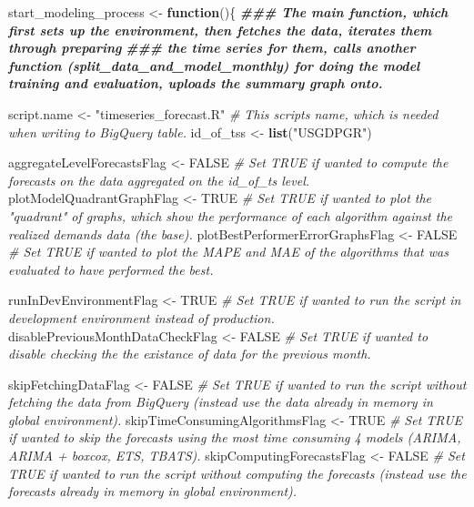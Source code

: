 \documentclass[
]{article}
\newenvironment{Shaded}{\begin{snugshade}}{\end{snugshade}}
\newcommand{\CommentTok}[1]{\textcolor[rgb]{0.56,0.35,0.01}{\textit{#1}}}
\newcommand{\ConstantTok}[1]{\textcolor[rgb]{0.56,0.35,0.01}{#1}}
\newcommand{\ControlFlowTok}[1]{\textcolor[rgb]{0.13,0.29,0.53}{\textbf{#1}}}
\newcommand{\DocumentationTok}[1]{\textcolor[rgb]{0.56,0.35,0.01}{\textbf{\textit{#1}}}}
\newcommand{\FunctionTok}[1]{\textcolor[rgb]{0.13,0.29,0.53}{\textbf{#1}}}
\newcommand{\NormalTok}[1]{#1}
\newcommand{\OtherTok}[1]{\textcolor[rgb]{0.56,0.35,0.01}{#1}}
\newcommand{\StringTok}[1]{\textcolor[rgb]{0.31,0.60,0.02}{#1}}
\begin{document}
\begin{Shaded}
\begin{Highlighting}[]
\NormalTok{start\_modeling\_process }\OtherTok{\textless{}{-}} \ControlFlowTok{function}\NormalTok{()\{}
\DocumentationTok{\#\#\# The main function, which first sets up the environment, then fetches the data, iterates them through preparing}
\DocumentationTok{\#\#\# the time series for them, calls another function (split\_data\_and\_model\_monthly) for doing the model training and evaluation, uploads the summary graph onto.}

\NormalTok{  script.name }\OtherTok{\textless{}{-}} \StringTok{"timeseries\_forecast.R"} \CommentTok{\# This script\textquotesingle{}s name, which is needed when writing to BigQuery table.}
\NormalTok{  id\_of\_tss }\OtherTok{\textless{}{-}} \FunctionTok{list}\NormalTok{(}\StringTok{"USGDPGR"}\NormalTok{)}
  
\NormalTok{  aggregateLevelForecastsFlag }\OtherTok{\textless{}{-}} \ConstantTok{FALSE} \CommentTok{\# Set TRUE if wanted to compute the forecasts on the data aggregated on the id\_of\_ts level.}
\NormalTok{  plotModelQuadrantGraphFlag }\OtherTok{\textless{}{-}} \ConstantTok{TRUE} \CommentTok{\# Set TRUE if wanted to plot the "quadrant" of graphs, which show the performance of each algorithm against the realized demands data (the base).}
\NormalTok{  plotBestPerformerErrorGraphsFlag }\OtherTok{\textless{}{-}} \ConstantTok{FALSE} \CommentTok{\# Set TRUE if wanted to plot the MAPE and MAE of the algorithms that was evaluated to have performed the best.}
  
\NormalTok{  runInDevEnvironmentFlag }\OtherTok{\textless{}{-}} \ConstantTok{TRUE} \CommentTok{\# Set TRUE if wanted to run the script in development environment instead of production.}
\NormalTok{  disablePreviousMonthDataCheckFlag }\OtherTok{\textless{}{-}} \ConstantTok{FALSE} \CommentTok{\# Set TRUE if wanted to disable checking the the existance of data for the previous month.}
  
\NormalTok{  skipFetchingDataFlag }\OtherTok{\textless{}{-}} \ConstantTok{FALSE} \CommentTok{\# Set TRUE if wanted to run the script without fetching the data from BigQuery (instead use the data already in memory in global environment).}
\NormalTok{  skipTimeConsumingAlgorithmsFlag }\OtherTok{\textless{}{-}} \ConstantTok{TRUE} \CommentTok{\# Set TRUE if wanted to skip the forecasts using the most time consuming 4 models (ARIMA, ARIMA + boxcox, ETS, TBATS).}
\NormalTok{  skipComputingForecastsFlag }\OtherTok{\textless{}{-}} \ConstantTok{FALSE} \CommentTok{\# Set TRUE if wanted to run the script without computing the forecasts (instead use the forecasts already in memory in global environment).}
    

\end{Highlighting}
\end{Shaded}
\end{document}
